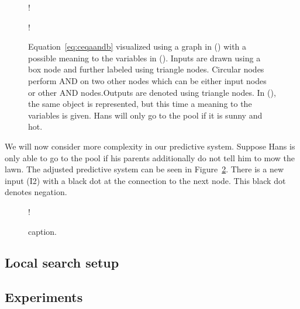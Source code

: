 \begin{figure}[!htb]
    \centering
  \begin{minipage}[b]{.4\linewidth}
    \centering
    \resizebox {0.53\textwidth} {!} {
      
    }
    \label{fig:aig1-num}
  \end{minipage}
  \begin{minipage}[b]{.4\linewidth}
    \centering
    \resizebox {0.7\textwidth} {!} {
      
    }
    \label{fig:aig1-text}
  \end{minipage}
\caption{Equation~\ref{eq:ceqaandb} visualized using a graph in () with a possible meaning to the variables in (). Inputs are drawn using a box node and further labeled using triangle nodes. Circular nodes perform AND on two other nodes which can be either input nodes or other AND nodes.Outputs are denoted using triangle nodes. In (), the same object is represented, but this time a meaning to the variables is given. Hans will only go to the pool if it is sunny and hot.}
\label{fig:aig1}
\end{figure}

\noindent We will now consider more complexity in our predictive system. Suppose Hans is only able to go to the pool if his parents additionally do not tell him to mow the lawn. The adjusted predictive system can be seen in Figure~\ref{fig:aig2}. There is a new input (I2) with a black dot at the connection to the next node. This black dot denotes negation.

\begin{figure}[!htb]
    \centering
    \resizebox {0.5\textwidth} {!} {
      
    }
    \caption{caption.}
\label{fig:aig2}
\end{figure}

\subsection{Local search setup}

\subsection{Experiments}

